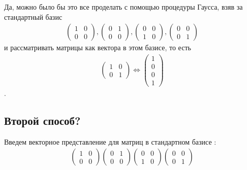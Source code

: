 \begin{remark}
    Да, можно было бы это все проделать с помощью процедуры Гаусса, взяв за стандартный базис 
    \begin{gather}
        \begin{pmatrix}
            1 & 0 \\ 0 & 0
        \end{pmatrix},
        \begin{pmatrix}
            0 & 1 \\ 0 & 0
        \end{pmatrix},
        \begin{pmatrix}
            0 & 0 \\ 1 & 0
        \end{pmatrix},
        \begin{pmatrix}
            0 & 0 \\ 0 & 1
        \end{pmatrix}
    \end{gather}
    и рассматривать матрицы как вектора в этом базисе, то есть
    \begin{gather}
        \begin{pmatrix}
            1 & 0 \\
            0 & 1
        \end{pmatrix} \Leftrightarrow 
        \begin{pmatrix}
            1 \\ 0 \\ 0 \\ 1
        \end{pmatrix}
    \end{gather}.
\end{remark}
\subsection{Второй способ?}
Введем векторное представление для матриц в стандартном базисе :
\begin{gather}
    \begin{pmatrix}
        1 & 0 \\
        0 & 0
    \end{pmatrix}
    \begin{pmatrix}
        0 & 1 \\
        0 & 0
    \end{pmatrix}
    \begin{pmatrix}
        0 & 0 \\
        1 & 0
    \end{pmatrix}
    \begin{pmatrix}
        0 & 0 \\
        0 & 1
    \end{pmatrix}
\end{gather}


